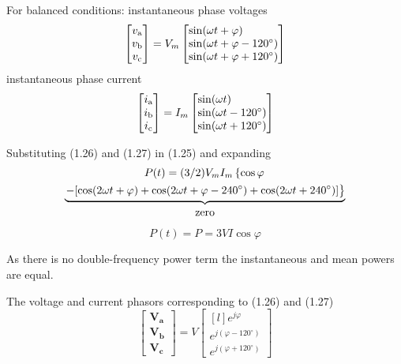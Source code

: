 \documentclass[a4paper,numbers=noenddot,12pt]{scrbook}
\begin{document}
For balanced conditions: instantaneous phase voltages
\begin{equation}
    \begin{bmatrix}
        v_\textup{a} \\ v_\textup{b} \\ v_\textup{c}
    \end{bmatrix}
    = V_m
    \begin{bmatrix*}[l]
        \sin(\omega t + \varphi) \\
        \sin(\omega t + \varphi - 120^\circ )\\
        \sin(\omega t + \varphi + 120^\circ )
    \end{bmatrix*}
    \label{eq:Eq1.26}
\end{equation}
instantaneous phase current
\begin{equation}
    \begin{bmatrix}
        i_\textup{a} \\ i_\textup{b} \\ i_\textup{c}
    \end{bmatrix}
    = I_m
    \begin{bmatrix*}[l]
        \sin(\omega t ) \\
        \sin(\omega t - 120^\circ )\\
        \sin(\omega t + 120^\circ )
    \end{bmatrix*}
    \label{eq:Eq1.27}
\end{equation}

Substituting (1.26) and (1.27) in (1.25) and expanding
\begin{multline*}
    P(t) = (3/2) V_m I_m \left\{\cos \varphi \right. \\
        \underbrace{\left.-[\cos (2 \omega t + \varphi) + \cos (2\omega t + \varphi - 240^\circ) + \cos (2 \omega t +240^\circ)]\right\}}_{%
            \begin{gathered}
                \text{zero}
            \end{gathered}}
        \end{multline*}
        \begin{equation}
            P(t) = P = 3 V I \cos \varphi
            \label{eq:Eq1.28}
        \end{equation}

        As there is no double-frequency power term the instantaneous and mean powers are equal.

        The voltage and current phasors corresponding to (1.26) and (1.27)
        \begin{equation}
            \begin{bmatrix}
                \mathbf{V_a} \\ \mathbf{V_b} \\ \mathbf{V_c}
            \end{bmatrix}
            = V
            \begin{bmatrix*}[l]
                e^{j \varphi} \\ e^{j (\varphi - 120^\circ)} \\ e^{j (\varphi + 120^\circ)}
            \end{bmatrix*}
            \label{eq:Eq1.29}
        \end{equation}
\end{document}
